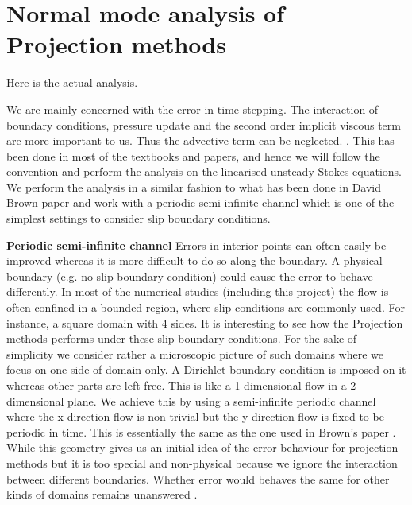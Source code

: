 \section{Normal mode analysis of Projection methods}
Here is the actual analysis.

We are mainly concerned with the error in time stepping. The interaction of boundary conditions, pressure update and the second order implicit viscous term are more important to us. Thus the advective term can be neglected. \cite{brown2001accurate,strikwerda1999accuracy,pyo2005normal,guermond2004error,liu1996projection,shen1996error,shen1992error}. This has been done in most of the textbooks and papers, and hence we will follow the convention and perform the analysis on the linearised unsteady Stokes equations.\\

We perform the analysis in a similar fashion to what has been done in David Brown paper \cite{brown2001accurate} and work with a periodic semi-infinite channel which is one of the simplest settings to consider slip boundary conditions.

\textbf{Periodic semi-infinite channel}
Errors in interior points can often easily be improved whereas it is more difficult to do so along the boundary. A physical boundary (e.g. no-slip boundary condition) could cause the error to behave differently. In most of the numerical studies (including this project) the flow is often confined in a bounded region, where slip-conditions are commonly used. For instance, a square domain with 4 sides. It is interesting to see how the Projection methods performs under these slip-boundary conditions. For the sake of simplicity we consider rather a microscopic picture of such domains where we focus on one side of domain only. A Dirichlet boundary condition is imposed on it whereas other parts are left free. This is like a 1-dimensional flow in a 2-dimensional plane. We achieve this by using a semi-infinite periodic channel where the x direction flow is non-trivial but the y direction flow is fixed to be periodic in time. This is essentially the same as the one used in Brown's paper \cite{brown2001accurate}. While this geometry gives us an initial idea of the error behaviour for projection methods but it is too special and non-physical because we ignore the interaction between different boundaries. Whether error would behaves the same for other kinds of domains remains unanswered \cite{pyo2005normal}. \\

